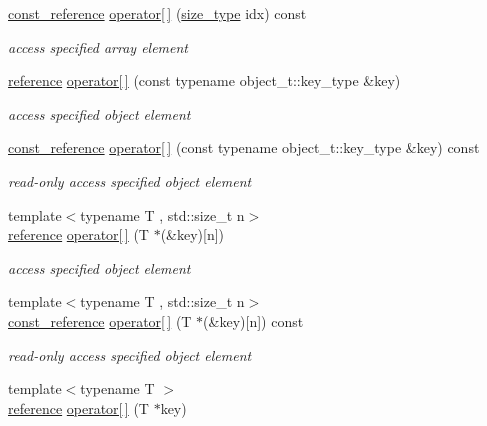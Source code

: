 \begin{DoxyCompactItemize}
\hyperlink{a00025_af677a29b0e66edc9f66e5167e4667071}{const\+\_\+reference} \hyperlink{a00025_a99f2e765029e51dd0fff018650f92eea}{operator\mbox{[}$\,$\mbox{]}} (\hyperlink{a00025_a1579a8f72a230358d6cd1a6e8a62859b}{size\+\_\+type} idx) const 
\begin{DoxyCompactList}\small\item\em access specified array element \end{DoxyCompactList}\item 
\hyperlink{a00025_a3ec8e17be8732fe436e9d6733f52b7a3}{reference} \hyperlink{a00025_a92fbb711a36b5ce78ee228b26787c034}{operator\mbox{[}$\,$\mbox{]}} (const typename object\+\_\+t\+::key\+\_\+type \&key)
\begin{DoxyCompactList}\small\item\em access specified object element \end{DoxyCompactList}\item 
\hyperlink{a00025_af677a29b0e66edc9f66e5167e4667071}{const\+\_\+reference} \hyperlink{a00025_a2e26bd0b0168abb61f67ad5bcd5b9fa1}{operator\mbox{[}$\,$\mbox{]}} (const typename object\+\_\+t\+::key\+\_\+type \&key) const 
\begin{DoxyCompactList}\small\item\em read-\/only access specified object element \end{DoxyCompactList}\item 
{\footnotesize template$<$typename T , std\+::size\+\_\+t n$>$ }\\\hyperlink{a00025_a3ec8e17be8732fe436e9d6733f52b7a3}{reference} \hyperlink{a00025_a140b8251f82e99ad279dcad5c977e26b}{operator\mbox{[}$\,$\mbox{]}} (T $\ast$(\&key)\mbox{[}n\mbox{]})
\begin{DoxyCompactList}\small\item\em access specified object element \end{DoxyCompactList}\item 
{\footnotesize template$<$typename T , std\+::size\+\_\+t n$>$ }\\\hyperlink{a00025_af677a29b0e66edc9f66e5167e4667071}{const\+\_\+reference} \hyperlink{a00025_ad9cd312208273fb3fb2adf1f6d8d34ae}{operator\mbox{[}$\,$\mbox{]}} (T $\ast$(\&key)\mbox{[}n\mbox{]}) const 
\begin{DoxyCompactList}\small\item\em read-\/only access specified object element \end{DoxyCompactList}\item 
{\footnotesize template$<$typename T $>$ }\\\hyperlink{a00025_a3ec8e17be8732fe436e9d6733f52b7a3}{reference} \hyperlink{a00025_ac7c006e2345a76859c4802db7d130e0e}{operator\mbox{[}$\,$\mbox{]}} (T $\ast$key)

\end{DoxyCompactItemize}
